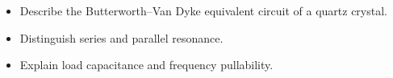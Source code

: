 \begin{objectives}
\begin{itemize}[leftmargin=1.4em,itemsep=2pt]
\item Describe the Butterworth--Van Dyke equivalent circuit of a quartz crystal.
\item Distinguish series and parallel resonance.
\item Explain load capacitance and frequency pullability.
\end{itemize}
\end{objectives}
